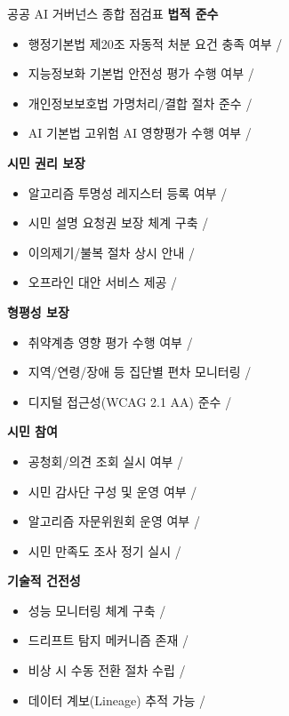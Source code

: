 \begin{practicaltool}{공공 AI 거버넌스 종합 점검표}
\textbf{법적 준수}
\begin{itemize}
    \item 행정기본법 제20조 자동적 처분 요건 충족 여부 \checkmark / \texttimes
    \item 지능정보화 기본법 안전성 평가 수행 여부 \checkmark / \texttimes
    \item 개인정보보호법 가명처리/결합 절차 준수 \checkmark / \texttimes
    \item AI 기본법 고위험 AI 영향평가 수행 여부 \checkmark / \texttimes
\end{itemize}

\textbf{시민 권리 보장}
\begin{itemize}
    \item 알고리즘 투명성 레지스터 등록 여부 \checkmark / \texttimes
    \item 시민 설명 요청권 보장 체계 구축 \checkmark / \texttimes
    \item 이의제기/불복 절차 상시 안내 \checkmark / \texttimes
    \item 오프라인 대안 서비스 제공 \checkmark / \texttimes
\end{itemize}

\textbf{형평성 보장}
\begin{itemize}
    \item 취약계층 영향 평가 수행 여부 \checkmark / \texttimes
    \item 지역/연령/장애 등 집단별 편차 모니터링 \checkmark / \texttimes
    \item 디지털 접근성(WCAG 2.1 AA) 준수 \checkmark / \texttimes
\end{itemize}

\textbf{시민 참여}
\begin{itemize}
    \item 공청회/의견 조회 실시 여부 \checkmark / \texttimes
    \item 시민 감사단 구성 및 운영 여부 \checkmark / \texttimes
    \item 알고리즘 자문위원회 운영 여부 \checkmark / \texttimes
    \item 시민 만족도 조사 정기 실시 \checkmark / \texttimes
\end{itemize}

\textbf{기술적 건전성}
\begin{itemize}
    \item 성능 모니터링 체계 구축 \checkmark / \texttimes
    \item 드리프트 탐지 메커니즘 존재 \checkmark / \texttimes
    \item 비상 시 수동 전환 절차 수립 \checkmark / \texttimes
    \item 데이터 계보(Lineage) 추적 가능 \checkmark / \texttimes
\end{itemize}


\end{practicaltool}
